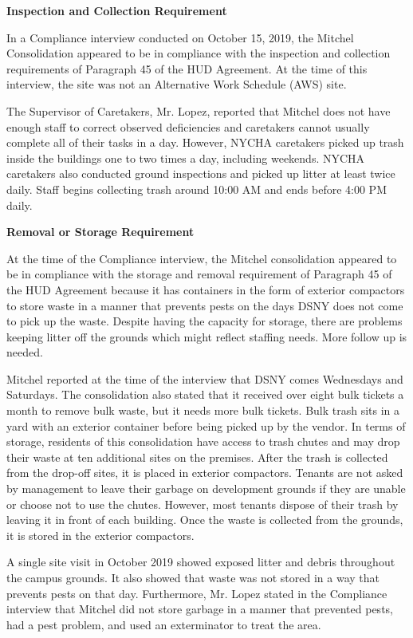 
\textbf{Inspection and Collection Requirement}

In a Compliance interview conducted on October 15, 2019, the Mitchel Consolidation appeared to be in compliance with the inspection and collection requirements of Paragraph 45 of the HUD Agreement. At the time of this interview, the site was not an Alternative Work Schedule (AWS) site. 

The Supervisor of Caretakers, Mr. Lopez, reported that Mitchel does not have enough staff to correct observed deficiencies and caretakers cannot usually complete all of their tasks in a day. However, NYCHA caretakers picked up trash inside the buildings one to two times a day, including weekends. NYCHA caretakers also conducted ground inspections and picked up litter at least twice daily. Staff begins collecting trash around 10:00 AM and ends before 4:00 PM daily. 

\textbf{Removal or Storage Requirement}

At the time of the Compliance interview, the Mitchel consolidation appeared to be in compliance with the storage and removal requirement of Paragraph 45 of the HUD Agreement because it has containers in the form of exterior compactors to store waste in a manner that prevents pests on the days DSNY does not come to pick up the waste. Despite having the capacity for storage, there are problems keeping litter off the grounds which might reflect staffing needs. More follow up is needed. 

Mitchel reported at the time of the interview that DSNY comes Wednesdays and Saturdays. The consolidation also stated that it received over eight bulk tickets a month to remove bulk waste, but it needs more bulk tickets. Bulk trash sits in a yard with an exterior container before being picked up by the vendor. In terms of storage, residents of this consolidation have access to trash chutes and may drop their waste at ten additional sites on the premises. After the trash is collected from the drop-off sites, it is placed in exterior compactors. Tenants are not asked by management to leave their garbage on development grounds if they are unable or choose not to use the chutes. However, most tenants dispose of their trash by leaving it in front of each building. Once the waste is collected from the grounds, it is stored in the exterior compactors.  

A single site visit in October 2019 showed exposed litter and debris throughout the campus grounds. It also showed that waste was not stored in a way that prevents pests on that day. Furthermore, Mr. Lopez stated in the Compliance interview that Mitchel did not store garbage in a manner that prevented pests, had a pest problem, and used an exterminator to treat the area.

